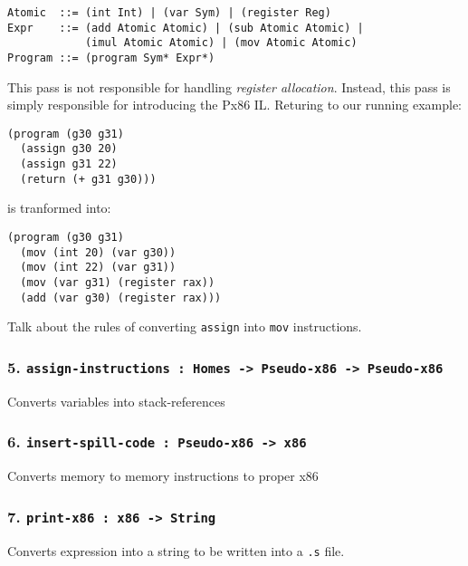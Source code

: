 \documentclass[12pt]{article}
\begin{document}
\begin{verbatim}
Atomic  ::= (int Int) | (var Sym) | (register Reg)
Expr    ::= (add Atomic Atomic) | (sub Atomic Atomic) | 
            (imul Atomic Atomic) | (mov Atomic Atomic)
Program ::= (program Sym* Expr*)
\end{verbatim}

This pass is not responsible for handling \textit{register allocation}. Instead,
this pass is simply responsible for introducing the Px86 IL. Returing to our
running example:
\begin{verbatim}
(program (g30 g31) 
  (assign g30 20)
  (assign g31 22)
  (return (+ g31 g30)))
\end{verbatim}
is tranformed into:
\begin{verbatim}
(program (g30 g31)
  (mov (int 20) (var g30))
  (mov (int 22) (var g31))
  (mov (var g31) (register rax))
  (add (var g30) (register rax)))
\end{verbatim}

Talk about the rules of converting {\tt assign} into {\tt mov} instructions.
\subsubsection*{5. {\tt assign-instructions : Homes -> Pseudo-x86 -> Pseudo-x86}}
Converts variables into stack-references
\subsubsection*{6. {\tt insert-spill-code : Pseudo-x86 -> x86}}
Converts memory to memory instructions to proper x86
\subsubsection*{7. {\tt print-x86 : x86 -> String}}
Converts expression into a string to be written into a {\tt .s} file.
\end{document}
